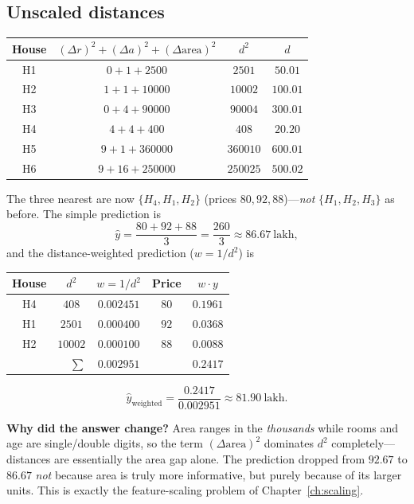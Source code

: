 \documentclass[11pt,a4paper]{report}
\theoremstyle{definition}
\theoremstyle{remark}
\begin{document}
	\subsection*{Unscaled distances}
	\begin{center}
		\renewcommand{\arraystretch}{1.2}
		\begin{tabular}{c c c c}
			\toprule
			House & $(\Delta r)^2+(\Delta a)^2+(\Delta\text{area})^2$ & $d^2$ & $d$\\
			\midrule
			H1 & $0+1+2500$    & $2501$   & $\mathbf{50.01}$\\
			H2 & $1+1+10000$   & $10002$  & $\mathbf{100.01}$\\
			H3 & $0+4+90000$   & $90004$  & $300.01$\\
			H4 & $4+4+400$     & $408$    & $\mathbf{20.20}$\\
			H5 & $9+1+360000$  & $360010$ & $600.01$\\
			H6 & $9+16+250000$ & $250025$ & $500.02$\\
			\bottomrule
		\end{tabular}
	\end{center}
	The three nearest are now $\{H_4,H_1,H_2\}$ (prices $80,92,88$)---\emph{not}
	$\{H_1,H_2,H_3\}$ as before. The simple prediction is
	\[
	\hat y=\frac{80+92+88}{3}=\frac{260}{3}\approx\boxed{86.67\ \text{lakh},}
	\]
	and the distance-weighted prediction ($w=1/d^2$) is
	\begin{center}
		\begin{tabular}{@{}ccccc@{}}
			\toprule
			House & $d^2$ & $w=1/d^2$ & Price & $w\cdot y$\\
			\midrule
			H4 & $408$   & $0.002451$ & $80$ & $0.1961$\\
			H1 & $2501$  & $0.000400$ & $92$ & $0.0368$\\
			H2 & $10002$ & $0.000100$ & $88$ & $0.0088$\\
			\midrule
			\multicolumn{2}{r}{$\sum$} & $0.002951$ & & $0.2417$\\
			\bottomrule
		\end{tabular}
	\end{center}
	\[
	\hat y_{\text{weighted}}=\frac{0.2417}{0.002951}\approx\boxed{81.90\ \text{lakh}.}
	\]
	
	\begin{conceptbox}
		\textbf{Why did the answer change?} Area ranges in the \emph{thousands} while
		rooms and age are single/double digits, so the term $(\Delta\text{area})^2$
		dominates $d^2$ completely---distances are essentially the area gap alone. The
		prediction dropped from $92.67$ to $86.67$ \emph{not} because area is truly more
		informative, but purely because of its larger units. This is exactly the
		feature-scaling problem of Chapter~\ref{ch:scaling}.
	\end{conceptbox}
	
\end{document}
